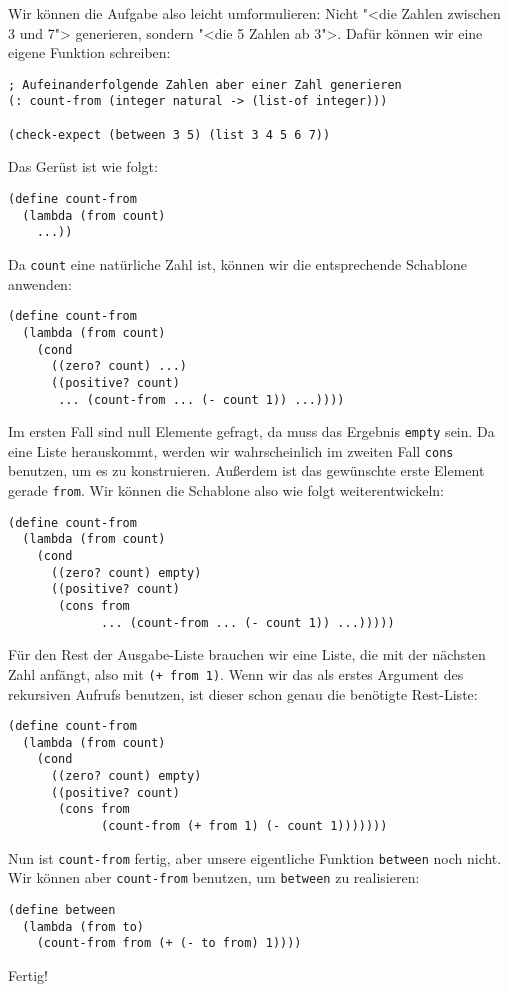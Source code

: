 Wir können die Aufgabe also leicht umformulieren: Nicht "<die Zahlen
zwischen 3 und 7"> generieren, sondern "<die 5 Zahlen ab 3">.  Dafür
können wir eine eigene Funktion schreiben:
%
\begin{lstlisting}
; Aufeinanderfolgende Zahlen aber einer Zahl generieren
(: count-from (integer natural -> (list-of integer)))

(check-expect (between 3 5) (list 3 4 5 6 7))
\end{lstlisting}
%
Das Gerüst ist wie folgt:
%
\begin{lstlisting}
(define count-from
  (lambda (from count)
    ...))
\end{lstlisting}
%
Da \lstinline{count} eine natürliche Zahl ist, können wir die
entsprechende Schablone anwenden:
%
\begin{lstlisting}
(define count-from
  (lambda (from count)
    (cond
      ((zero? count) ...)
      ((positive? count)
       ... (count-from ... (- count 1)) ...))))
\end{lstlisting}
%
Im ersten Fall sind null Elemente gefragt, da muss das Ergebnis
\lstinline{empty} sein.  Da eine Liste herauskommt, werden wir
wahrscheinlich im zweiten Fall \lstinline{cons} benutzen, um es zu
konstruieren.  Außerdem ist das gewünschte erste Element gerade
\lstinline{from}.  Wir können die Schablone also wie folgt
weiterentwickeln:
%
\begin{lstlisting}
(define count-from
  (lambda (from count)
    (cond
      ((zero? count) empty)
      ((positive? count)
       (cons from
             ... (count-from ... (- count 1)) ...)))))
\end{lstlisting}
%
Für den Rest der Ausgabe-Liste brauchen wir eine Liste, die mit der
nächsten Zahl anfängt, also mit \lstinline{(+ from 1)}.  Wenn wir das
als erstes Argument des rekursiven Aufrufs benutzen, ist dieser schon
genau die benötigte Rest-Liste:
%
\begin{lstlisting}
(define count-from
  (lambda (from count)
    (cond
      ((zero? count) empty)
      ((positive? count)
       (cons from
             (count-from (+ from 1) (- count 1)))))))
\end{lstlisting}
%
Nun ist \lstinline{count-from} fertig, aber unsere eigentliche Funktion
\lstinline{between} noch nicht.  Wir können aber \lstinline{count-from}
benutzen, um \lstinline{between} zu realisieren:
%
\begin{lstlisting}
(define between
  (lambda (from to)
    (count-from from (+ (- to from) 1))))
\end{lstlisting}
%
Fertig!

